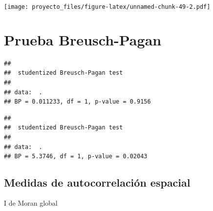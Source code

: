 \documentclass[11pt,]{article}
\newenvironment{Shaded}{\begin{snugshade}}{\end{snugshade}}
\newcommand{\KeywordTok}[1]{\textcolor[rgb]{0.13,0.29,0.53}{\textbf{#1}}}
\newcommand{\StringTok}[1]{\textcolor[rgb]{0.31,0.60,0.02}{#1}}
\newcommand{\OperatorTok}[1]{\textcolor[rgb]{0.81,0.36,0.00}{\textbf{#1}}}
\newcommand{\NormalTok}[1]{#1}
\begin{document}
\texttt{[image: proyecto\_files/figure-latex/unnamed-chunk-49-2.pdf]}

\section{Prueba Breusch-Pagan}\label{prueba-breusch-pagan}

\begin{Shaded}
\end{Shaded}

\begin{verbatim}
## 
##  studentized Breusch-Pagan test
## 
## data:  .
## BP = 0.011233, df = 1, p-value = 0.9156
\end{verbatim}

\begin{Shaded}
\end{Shaded}

\begin{verbatim}
## 
##  studentized Breusch-Pagan test
## 
## data:  .
## BP = 5.3746, df = 1, p-value = 0.02043
\end{verbatim}

\subsection{Medidas de autocorrelación
espacial}\label{medidas-de-autocorrelaciuxf3n-espacial}

I de Moran global

\begin{Shaded}
\end{Shaded}
\end{document}
